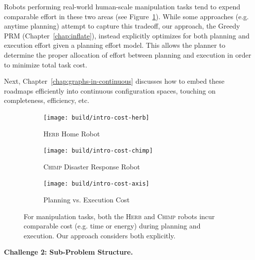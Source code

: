 Robots performing real-world human-scale manipulation tasks
tend to expend comparable effort in these two areas
(see Figure~\ref{fig:plan-exec-cost}).
While some approaches (e.g. anytime planning) attempt to capture
this tradeoff,
our approach,
the Greedy PRM (Chapter~\ref{chap:inflate}),
instead explicitly optimizes for both planning
and execution effort
given a planning effort model.
This allows the planner to determine the proper allocation of effort
between planning and execution in order to minimize total task cost.

Next, Chapter~\ref{chap:graphs-in-continuous}
discusses how to embed these roadmaps efficiently
into continuous configuration spaces,
touching on completeness,
efficiency, etc.

{
\setlength{\offsetpage}{0.5in}
\begin{figure}
\begin{widepage}
\begin{center}
   \begin{subfigure}[b]{1.4in}
      \begin{center}
      \texttt{[image: build/intro-cost-herb]}
      \end{center}
      \caption{\textsc{Herb} Home Robot}
   \end{subfigure}%
   \quad%
   \begin{subfigure}[b]{2.0in}
      \begin{center}
      \texttt{[image: build/intro-cost-chimp]}
      \end{center}
      \caption{\textsc{Chimp} Disaster Response Robot}
   \end{subfigure}%
   \quad%
   \begin{subfigure}[b]{2.0in}
      \begin{center}
      \texttt{[image: build/intro-cost-axis]}
      \end{center}
      \caption{Planning vs. Execution Cost}
   \end{subfigure}
   \caption{For manipulation tasks,
      both the \textsc{Herb} \cite{srinivasa2012herb20}
      and \textsc{Chimp} \cite{stentz2014chimp} robots
      incur comparable cost (e.g. time or energy)
      during planning and execution.
      Our approach considers both explicitly.}
   \label{fig:plan-exec-cost}
\end{center}
\end{widepage}
\end{figure}
}

\textbf{Challenge 2: Sub-Problem Structure.}

